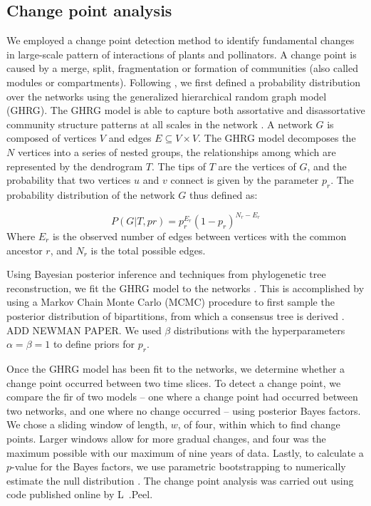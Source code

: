 \documentclass[12pt]{article}
\begin{document}
\subsection*{Change point analysis}

We employed a change point detection method \citep{peel2014detecting}
to identify fundamental changes in large-scale pattern of interactions
of plants and pollinators. A change point is caused by a merge, split,
fragmentation or formation of communities (also called modules or
compartments). Following \cite{peel2014detecting}, we first defined a
probability distribution over the networks using the generalized
hierarchical random graph model (GHRG). The GHRG model is able to
capture both assortative and disassortative community structure
patterns at all scales in the network \citep{peel2014detecting}. A
network $G$ is composed of vertices $V$ and edges $E \subseteq {V × V
}$. The GHRG model decomposes the $N$ vertices into a series of nested
groups, the relationships among which are represented by the
dendrogram $T$.  The tips of $T$ are the vertices of $G$, and the
probability that two vertices $u$ and $v$ connect is given by the
parameter $p_r$. The probability distribution of the network $G$ thus
defined as:

\begin{equation}
    \label{eq:lik}
    P(G|T,{pr}) = p_r^{E_r}(1-p_r)^{N_r-E_r}
\end{equation}
% 
Where $E_r$ is the observed number of edges between vertices with the
common ancestor $r$, and $N_r$ is the total possible edges. 

Using Bayesian posterior inference and techniques from phylogenetic
tree reconstruction, we fit the GHRG model to the networks
\citep{peel2014detecting}. This is accomplished by using a Markov
Chain Monte Carlo (MCMC) procedure to first sample the posterior
distribution of bipartitions, from which a consensus tree is derived
\citep{peel2014detecting}. ADD NEWMAN PAPER. We used $\beta$
distributions with the hyperparameters $\alpha=\beta=1$ to define
priors for $p_r$.

Once the GHRG model has been fit to the networks, we determine whether
a change point occurred between two time slices. To detect a change
point, we compare the fir of two models -- one where a change point
had occurred between two networks, and one where no change occurred --
using posterior Bayes factors. We chose a sliding window of length,
$w$, of four, within which to find change points. Larger windows allow
for more gradual changes, and four was the maximum possible with our
maximum of nine years of data. Lastly, to calculate a $p$-value for
the Bayes factors, we use parametric bootstrapping to numerically
estimate the null distribution \citep{peel2014detecting}. The change
point analysis was carried out using code published online by L~.Peel.
\end{document}
